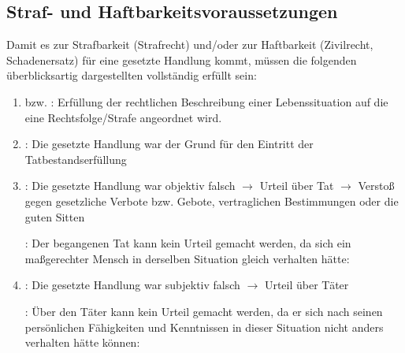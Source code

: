 \subsection{Straf- und Haftbarkeitsvoraussetzungen}
\label{topic:strafbarkeitspruefung}
\label{topic:haftbarkeitspruefung}
\label{topic:strafbarkeitsvoraussetzung}
\label{topic:haftbarkeitsvoraussetzung}



{Damit es zur Strafbarkeit
(Strafrecht) und/oder zur Haftbarkeit (Zivilrecht, Schadenersatz) für eine
gesetzte Handlung kommt, müssen die folgenden
überblicksartig dargestellten 
vollständig erfüllt sein:

\begin{enumerate}
  \item {} bzw. :
  Erfüllung der rechtlichen Beschreibung einer
  Lebenssituation auf die eine Rechtsfolge/Strafe angeordnet
  wird.
  \item {}: Die gesetzte Handlung war der Grund
  für den Eintritt der Tatbestandserfüllung
  \item {}: Die gesetzte Handlung war
  objektiv falsch ${\rightarrow}$ Urteil über Tat
  ${\rightarrow}$ Verstoß gegen gesetzliche Verbote bzw.
  Gebote, vertraglichen Bestimmungen oder die guten Sitten
  
  :  Der begangenen Tat kann kein
  Urteil gemacht werden, da sich ein maßgerechter Mensch in 
  derselben Situation gleich verhalten
  hätte:
  \item {}: Die gesetzte Handlung war
  subjektiv falsch ${\rightarrow}$ Urteil über
  Täter
  
  : Über den Täter kann kein
  Urteil gemacht werden, da er sich nach seinen persönlichen
  Fähigkeiten und Kenntnissen in dieser Situation nicht
  anders verhalten hätte können:
  

\end{enumerate}}
